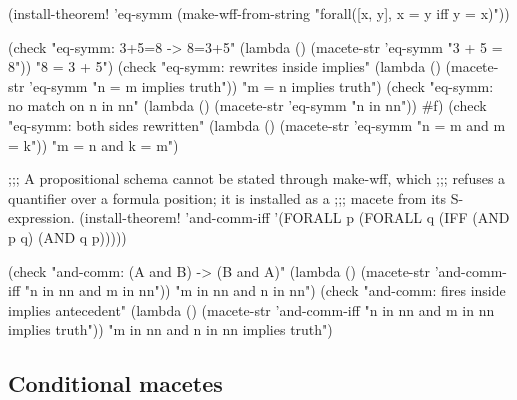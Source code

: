 \begin{VNBcode}
(install-theorem! 'eq-symm
  (make-wff-from-string "forall([x, y], x = y iff y = x)"))

(check "eq-symm: 3+5=8 -> 8=3+5"
       (lambda () (macete-str 'eq-symm "3 + 5 = 8"))
       "8 = 3 + 5")
(check "eq-symm: rewrites inside implies"
       (lambda () (macete-str 'eq-symm "n = m implies truth"))
       "m = n implies truth")
(check "eq-symm: no match on n in nn"
       (lambda () (macete-str 'eq-symm "n in nn"))
       #f)
(check "eq-symm: both sides rewritten"
       (lambda () (macete-str 'eq-symm "n = m and m = k"))
       "m = n and k = m")

;;; A propositional schema cannot be stated through make-wff, which
;;; refuses a quantifier over a formula position; it is installed as a
;;; macete from its S-expression.
(install-theorem! 'and-comm-iff
  '(FORALL p (FORALL q (IFF (AND p q) (AND q p)))))

(check "and-comm: (A and B) -> (B and A)"
       (lambda () (macete-str 'and-comm-iff "n in nn and m in nn"))
       "m in nn and n in nn")
(check "and-comm: fires inside implies antecedent"
       (lambda () (macete-str 'and-comm-iff "n in nn and m in nn implies truth"))
       "m in nn and n in nn implies truth")
\end{VNBcode}

\subsection*{Conditional macetes}

